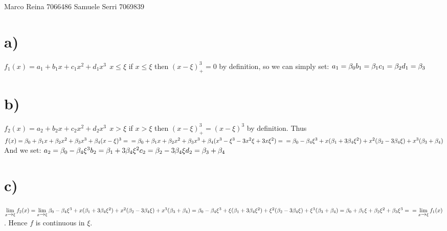 \documentclass[12pt]{article}
\begin{document}
\section*{}
Marco Reina 7066486 \newline
Samuele Serri 7069839 \newline
\section*{}
\section*{a)}
$f_1(x) = a_1 + b_1x + c_1x^2 + d_1x^3 \  \ x\leq\xi$ \newline
if $x \leq \xi$ then $(x - \xi)_{+}^3 = 0$ by definition, so we can simply set: \newline
$a_1  = \beta_0 \\ b_1 = \beta_1 \\ c_1 = \beta_2 \\ d_1 = \beta_3$
\section*{b)}
$f_2(x) = a_2 + b_2x + c_2x^2 + d_2x^3 \ \ x>\xi$ \newline
if $x > \xi$ then $(x - \xi)^3_+ = ( x - \xi)^3$ by definition. \newline
Thus $f(x) = \beta_0 + \beta_1x + \beta_2x^2+\beta_3 x^3 + \beta_4(x - \xi)^3 = \\
= \beta_0 + \beta_1x + \beta_2x^2 + \beta_3x^3 + \beta_4(x^3 - \xi^3 -3x^2\xi + 3x\xi^2) = \\
= \beta_0 - \beta_4\xi^3 + x(\beta_1 + 3\beta_4\xi^2) + x^2(\beta_2 - 3\beta_4\xi) + x^3(\beta_3 + \beta_4) \\$
And we set: \newline
$a_2 = \beta_0 - \beta_4\xi^3 \\ b_2 = \beta_1 + 3\beta_4\xi^2 \\ c_2 = \beta_2 - 3\beta_4\xi \\ d_2 = \beta_3 + \beta_4$
\section*{c)}
$\lim\limits_{x\xrightarrow{}\xi}f_2(x) = \lim\limits_{x\xrightarrow{}\xi}\beta_0 - \beta_4\xi^3 + x(\beta_1 + 3\beta_4\xi^2) + x^2(\beta_2 - 3\beta_4\xi) + x^3(\beta_3 + \beta_4) = \beta_0 - \beta_4\xi^3 + \xi(\beta_1 + 3\beta_4\xi^2) + \xi^2(\beta_2 - 3\beta_4\xi)  + \xi^3(\beta_3 + \beta_4) = \beta_0 + \beta_1\xi + \beta_2\xi^2 + \beta_3\xi^3 = \\ = \lim\limits_{x\xrightarrow{}\xi}f_1(x)$. \newline
Hence $f$ is continuous in $\xi$.
\end{document}
